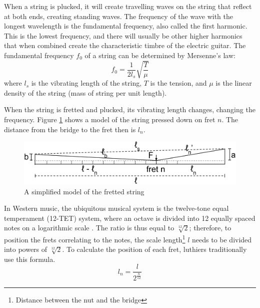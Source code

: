 When a string is plucked, it will create travelling waves on the string that reflect at both ends, creating standing waves. The frequency of the wave with the longest wavelength is the fundamental frequency, also called the first harmonic. This is the lowest frequency, and there will usually be other higher harmonics that when combined create the characteristic timbre of the electric guitar.
The fundamental frequency $f_0$ of a string can be determined by Mersenne's law:
\begin{equation}\label{eqn1}
    f_0 = \frac{1}{2l_s}\sqrt{\frac{T}{\mu}}
\end{equation}
where $l_s$ is the vibrating length of the string, $T$ is the tension, and $\mu$ is the linear density of the string (mass of string per unit length). \cite{mersenne} \par
When the string is fretted and plucked, its vibrating length changes, changing the frequency. Figure \ref{fig2} shows a model of the string pressed down on fret $n$. The distance from the bridge to the fret then is $l_n$.

\begin{figure}[!htbp]
    \includegraphics[width=\textwidth]{./ee/fig3.png}
    \caption{A simplified model of the fretted string}\label{fig2}
\end{figure}
In Western music, the ubiquitous musical system is the twelve-tone equal temperament (12-TET) system, where an octave is divided into 12 equally spaced notes on a logarithmic scale \cite{yuval}. The ratio is thus equal to $\sqrt[12]{2}$; therefore, to position the frets correlating to the notes, the scale length\footnote{Distance between the nut and the bridge} $l$ needs to be divided into powers of $\sqrt[12]{2}$. To calculate the position of each fret, luthiers traditionally use this formula. \cite{eqn6}
\begin{equation}\label{eqn2}
    l_n=\frac{l}{2^\frac{n}{12}}
\end{equation}